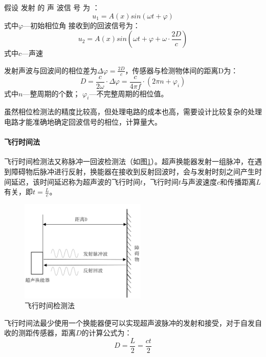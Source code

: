     假设 发射 的 声 波信 号 为 ：
    \begin{equation}
    	u_1=A(x)sin(\omega t + \varphi)
    \end{equation}
式中\quad$\varphi$---初始相位角
接收到的回波信号为：
\begin{equation}
	u_2=A(x)sin(\omega t + \varphi + \omega \cdot{\frac{2D}{c}})
\end{equation}
式中\quad$c$---声速\par
发射声波与回波间的相位差为$\Delta \varphi=\frac{2D}{c}$，传感器与检测物体间的距离D为：
\begin{equation}
	D=\frac{c}{2\omega}\cdot \Delta \varphi=\frac{c}{4\pi f}\cdot(2\pi n + \varphi_i)
\end{equation}
式中\quad$n$---整周期的个数；
\quad$\varphi_i$---不完整周期的相位值。\par
虽然相位检测法的精度比较高，但处理电路的成本也高，需要设计比较复杂的处理电路才能准确地确定回波信号的相位，计算量大。\par



    
    \paragraph{飞行时间法}
    飞行时间检测法又称脉冲一回波检测法（如图\ref{飞行时间检测法}）。超声换能器发射一组脉冲，在遇到障碍物后脉冲进行反射，换能器在接收到反射回波时，会与发射时刻之间产生时间延迟，该时间延迟称为超声波的飞行时间$t$，飞行时间$t$与声波速度$c$和传播距离$L$有关，即$t=\frac{L}{c}$。
    \begin{figure}[!h]
    	\centering
    	\includegraphics[width=6cm]{figure/飞行时间检测法.png}
    	\caption{飞行时间检测法}
    	\label{飞行时间检测法}
    \end{figure}\par
    飞行时间法最少使用一个换能器便可以实现超声波脉冲的发射和接受，对于自发自收的测距传感器，距离$D$的计算公式为：
    \begin{equation}
    	D=\frac{L}{2}=\frac{ct}{2}
    \end{equation}\par

